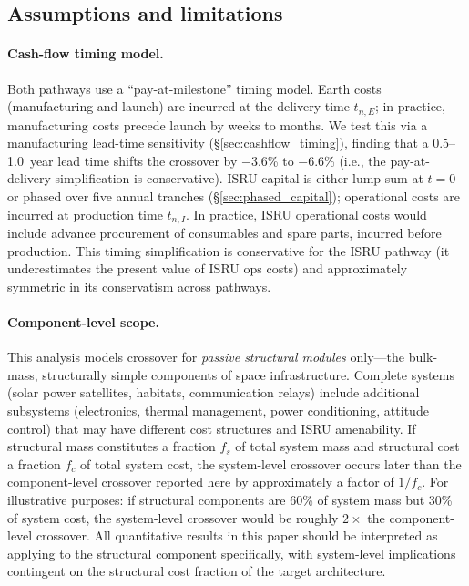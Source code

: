 \documentclass[preprint,12pt]{elsarticle}
\begin{document}
\subsection{Assumptions and limitations}

\paragraph{Cash-flow timing model.} Both pathways use a ``pay-at-milestone'' timing model. Earth costs (manufacturing and launch) are incurred at the delivery time $t_{n,E}$; in practice, manufacturing costs precede launch by weeks to months. We test this via a manufacturing lead-time sensitivity (\S\ref{sec:cashflow_timing}), finding that a 0.5--1.0~year lead time shifts the crossover by $-$3.6\% to $-$6.6\% (i.e., the pay-at-delivery simplification is conservative). ISRU capital is either lump-sum at $t = 0$ or phased over five annual tranches (\S\ref{sec:phased_capital}); operational costs are incurred at production time $t_{n,I}$. In practice, ISRU operational costs would include advance procurement of consumables and spare parts, incurred before production. This timing simplification is conservative for the ISRU pathway (it underestimates the present value of ISRU ops costs) and approximately symmetric in its conservatism across pathways.

\paragraph{Component-level scope.} This analysis models crossover for \emph{passive structural modules} only---the bulk-mass, structurally simple components of space infrastructure. Complete systems (solar power satellites, habitats, communication relays) include additional subsystems (electronics, thermal management, power conditioning, attitude control) that may have different cost structures and ISRU amenability. If structural mass constitutes a fraction $f_s$ of total system mass and structural cost a fraction $f_c$ of total system cost, the system-level crossover occurs later than the component-level crossover reported here by approximately a factor of $1/f_c$. For illustrative purposes: if structural components are 60\% of system mass but 30\% of system cost, the system-level crossover would be roughly $2\times$ the component-level crossover. All quantitative results in this paper should be interpreted as applying to the structural component specifically, with system-level implications contingent on the structural cost fraction of the target architecture.
\end{document}
